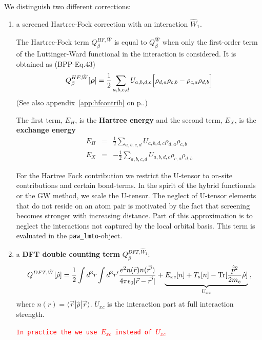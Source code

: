 \documentclass[11pt,a4paper]{report}
\newcommand{\petertt}[1]{\textcolor{red}{\texttt{#1}}}
\begin{document}
We distinguish two different corrections:
\begin{enumerate}
\item a screened Hartree-Fock correction with an interaction
  $\hat{W}_1$. 

  The Hartree-Fock term $Q^{HF,\hat{W}}_{\beta}$ is equal to
  $Q^{\hat{W}}_\beta$ when only the first-order term of the
  Luttinger-Ward functional in the interaction is considered.  It is
  obtained as (BPP-Eq.43)
  \begin{eqnarray}
  Q_{\beta}^{HF,\hat{W}}[\bm{\rho}]
  =\frac{1}{2}\sum_{a,b,c,d}U_{a,b,d,c}
   \Bigl[\rho_{d,a}\rho_{c,b}-\rho_{c,a}\rho_{d,b}\Bigr]
  \end{eqnarray}
  (See also appendix~\ref{app:hfcontrib} on p.\pageref{app:hfcontrib}.)

  The first term, $E_H$, is the \textbf{Hartree energy} and the second term, $E_X$, is the \textbf{exchange
    energy}
  \begin{eqnarray}
    E_{H}& =&\frac{1}{2}\sum_{a,b,c,d}U_{a,b,d,c}\rho_{d,a}\rho_{c,b}
   \nonumber\\
    E_{X}& =&-\frac{1}{2}\sum_{a,b,c,d}U_{a,b,d,c}\rho_{c,a}\rho_{d,b}
  \end{eqnarray}

  For the Hartree Fock contribution we restrict the U-tensor to on-site
  contributions and certain bond-terms. In the spirit of the hybrid
  functionals or the GW method, we scale the U-tensor. The neglect of
  U-tensor elements that do not reside on an atom pair is motivated by
  the fact that screening becomes stronger with increasing
  distance. Part of this approximation is to neglect the interactions
  not captured by the local orbital basis. This term is evaluated in
  the \verb|paw_lmto|-object.
%
\item a \textbf{DFT double counting term} $Q^{DFT,\hat{W}_1}_\beta$:
  \begin{eqnarray}
  Q^{DFT,\hat{W}}[\hat{\rho}]=
  \frac{1}{2}\int d^3r\int d^3r'
  \frac{e^2n(\vec{r})n(\vec{r'})}{4\pi\epsilon_0|\vec{r}-\vec{r'}|}
  +\underbrace{E_{xc}[n]+T_s[n]
  -\mathrm{Tr}[\frac{\hat{\vec{p}}^2}{2m_e}\hat{\rho}]}_{U_{xc}}\;,
  \end{eqnarray}
 where $n(r)=\langle\vec{r}|\hat{\rho}|\vec{r}\rangle$.  $U_{xc}$ is
 the interaction part at full interaction strength.

  \petertt{In practice the we use $E_{xc}$ instead of $U_{xc}$}


\end{enumerate}
\end{document}
